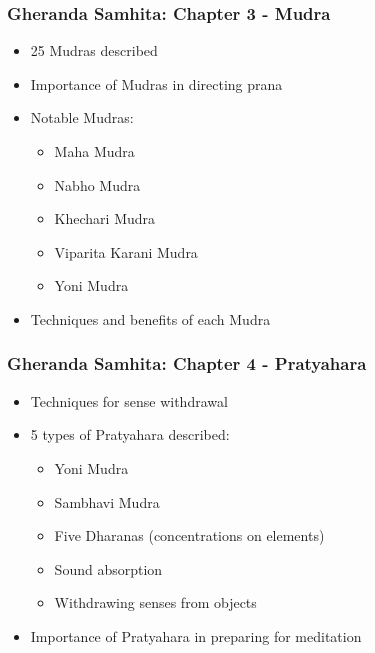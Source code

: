 \begin{frame}[fragile]\frametitle{Gheranda Samhita: Chapter 3 - Mudra}
\begin{itemize}
    \item 25 Mudras described
    \item Importance of Mudras in directing prana
    \item Notable Mudras:
    \begin{itemize}
        \item Maha Mudra
        \item Nabho Mudra
        \item Khechari Mudra
        \item Viparita Karani Mudra
        \item Yoni Mudra
    \end{itemize}
    \item Techniques and benefits of each Mudra
\end{itemize}
\end{frame}

\begin{frame}[fragile]\frametitle{Gheranda Samhita: Chapter 4 - Pratyahara}
\begin{itemize}
    \item Techniques for sense withdrawal
    \item 5 types of Pratyahara described:
    \begin{itemize}
        \item Yoni Mudra
        \item Sambhavi Mudra
        \item Five Dharanas (concentrations on elements)
        \item Sound absorption
        \item Withdrawing senses from objects
    \end{itemize}
    \item Importance of Pratyahara in preparing for meditation
\end{itemize}
\end{frame}

